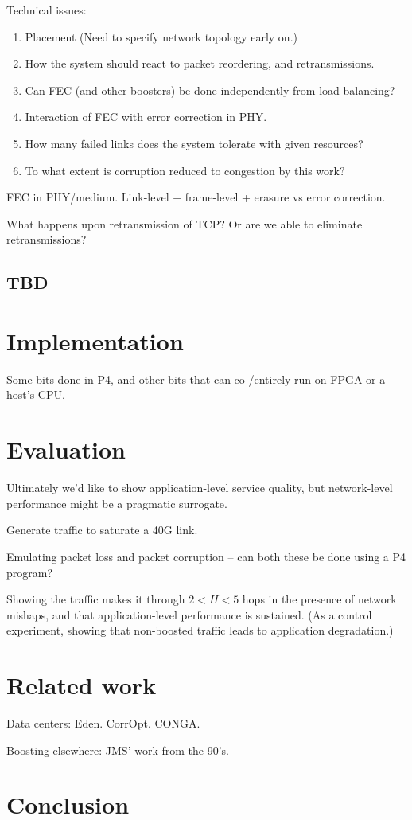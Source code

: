 \documentclass[sigconf]{acmart}
\begin{document}
Technical issues:
\begin{enumerate}
  \item Placement (Need to specify network topology early on.)
  \item How the system should react to packet reordering, and retransmissions.
  \item Can FEC (and other boosters) be done independently from load-balancing?
  \item Interaction of FEC with error correction in PHY.
  \item How many failed links does the system tolerate with given resources?
  \item To what extent is corruption reduced to congestion by this work?
\end{enumerate}

FEC in PHY/medium. Link-level + frame-level + erasure vs error correction.

What happens upon retransmission of TCP? Or are we able to eliminate retransmissions?


\subsection{TBD}

\section{Implementation}
Some bits done in P4, and other bits that can co-/entirely run on FPGA or a host's CPU.

\section{Evaluation}
Ultimately we'd like to show application-level service quality, but
network-level performance might be a pragmatic surrogate.

Generate traffic to saturate a 40G link.

Emulating packet loss and packet corruption -- can both these be done using a P4 program?

Showing the traffic makes it through $2 < H < 5$ hops in the presence of
network mishaps, and that application-level performance is sustained.
(As a control experiment, showing that non-boosted traffic leads to application degradation.)

\section{Related work}
Data centers:
Eden.
CorrOpt.
CONGA.

Boosting elsewhere: JMS' work from the 90's.

\section{Conclusion}


 
\end{document}
